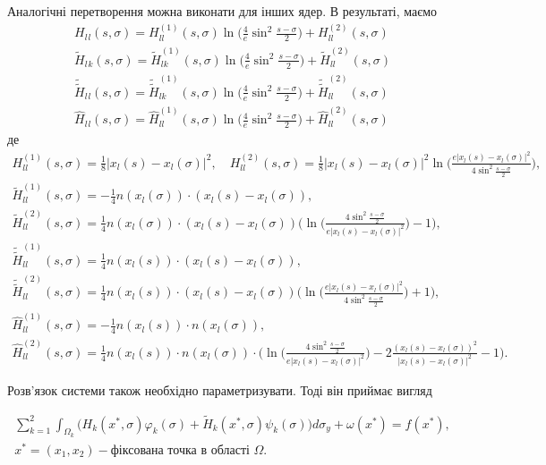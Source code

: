 \documentclass[12pt]{report}
\begin{document}
 Аналогічні перетворення можна виконати для інших ядер. В результаті, маємо
 \begin{gather}
 	H_l{_l}(s, \sigma)=H^{(1)}_{ll}(s, \sigma)\ln\bigg(\frac{4}{e}\sin^2\frac{s-\sigma}{2}\bigg)+H^{(2)}_{ll}(s, \sigma) \\
	\tilde{H}_l{_k}(s, \sigma)=\tilde{H}^{(1)}_{lk}(s, \sigma)\ln\bigg(\frac{4}{e}\sin^2\frac{s-\sigma}{2}\bigg)+\tilde{H}^{(2)}_{ll}(s, \sigma) \\
	\tilde{\tilde{H}}_l{_l}(s, \sigma)=\tilde{\tilde{H}}^{(1)}_{lk}(s, \sigma)\ln\bigg(\frac{4}{e}\sin^2\frac{s-\sigma}{2}\bigg)+\tilde{\tilde{H}}^{(2)}_{ll}(s, \sigma) \\
	\hat{H}_l{_l}(s, \sigma)=\hat{H}^{(1)}_{ll}(s, \sigma)\ln\bigg(\frac{4}{e}\sin^2\frac{s-\sigma}{2}\bigg)+\hat{H}^{(2)}_{ll}(s, \sigma)
 \end{gather}
 де 
\begin{gather*}
	H^{(1)}_{ll}(s, \sigma)=\frac{1}{8}|x_l(s)-x_l(\sigma)|^2, \quad H^{(2)}_{ll}(s, \sigma)=\frac{1}{8}|x_l(s)-x_l(\sigma)|^2\ln\Big(\frac{e|x_l(s)-x_l(\sigma)|^2}{4\sin^2\frac{s-\sigma}{2}}\Big), \\
	\tilde{H}^{(1)}_{ll}(s, \sigma)=-\frac{1}{4}n(x_l(\sigma))\cdot(x_l(s)-x_l(\sigma)), \\
	 \tilde{H}^{(2)}_{ll}(s, \sigma)= \frac{1}{4}n(x_l(\sigma))\cdot(x_l(s)-x_l(\sigma))\bigg(\ln\Big(\frac{4\sin^2\frac{s-\sigma}{2}}{e|x_l(s)-x_l(\sigma)|^2}\Big)-1\bigg),\\
	\tilde{\tilde{H}}^{(1)}_{ll}(s, \sigma)=\frac{1}{4}n(x_l(s))\cdot(x_l(s)-x_l(\sigma)), \\
	 \tilde{\tilde{H}}^{(2)}_{ll}(s, \sigma)= \frac{1}{4}n(x_l(s))\cdot(x_l(s)-x_l(\sigma))\bigg(\ln\Big(\frac{e|x_l(s)-x_l(\sigma)|^2}{4\sin^2\frac{s-\sigma}{2}}\Big)+1\bigg),\\
	\hat{H}^{(1)}_{ll}(s, \sigma)= -\frac{1}{4}n(x_l(s))\cdot n(x_l(\sigma)), \\
	 \hat{H}^{(2)}_{ll}(s, \sigma)=\frac{1}{4}n(x_l(s))\cdot n(x_l(\sigma))\cdot\bigg(\ln\Big(\frac{4\sin^2\frac{s-\sigma}{2}}{e|x_l(s)-x_l(\sigma)|^2}\Big)-2\frac{(x_l(s)-x_l(\sigma))^2}{|x_l(s)-x_l(\sigma)|^2} -1\bigg).
 \end{gather*}
 
 Розв'язок системи також необхідно параметризувати. Тоді він приймає вигляд
 
 \begin{equation}
 \begin{split}
	\sum_{k=1}^{2}\int_{\Omega_k}\bigg(H_{k}(x^*, \sigma)\varphi_k(\sigma)+\tilde{H}_{k}(x^*, \sigma)\psi_k(\sigma)\bigg)d\sigma_y+\omega(x^*)=f(x^*), \\
	 x^*=(x_1,x_2) - \textrm{фіксована точка в області } \Omega.
\end{split}
 \end{equation}
 
\end{document}
